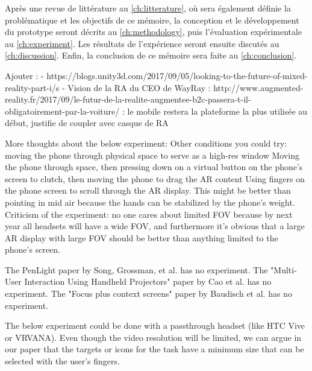 
Après une revue de littérature au \autoref{ch:litterature}, où sera également définie la problématique et les objectifs de ce mémoire, la conception et le développement du prototype seront décrits au \autoref{ch:methodology}, puis l'évaluation expérimentale au \autoref{ch:experiment}. Les résultats de l'expérience seront ensuite discutés au \autoref{ch:discussion}. Enfin, la conclusion de ce mémoire sera faite au \autoref{ch:conclusion}.


Ajouter :
- https://blogs.unity3d.com/2017/09/05/looking-to-the-future-of-mixed-reality-part-i/s
- Vision de la RA du CEO de WayRay : http://www.augmented-reality.fr/2017/09/le-futur-de-la-realite-augmentee-b2c-passera-t-il-obligatoirement-par-la-voiture/ : le mobile restera la plateforme la plus utilisée au début, justifie de coupler avec casque de RA


More thoughts about the below experiment:
Other conditions you could try: moving the phone through physical space to serve as a high-res window
Moving the phone through space, then pressing down on a virtual button on the phone's screen to clutch, then moving the phone to drag the AR content
Using fingers on the phone screen to scroll through the AR display. This might be better than pointing in mid air because the hands can be stabilized by the phone's weight.
Criticism of the experiment: no one cares about limited FOV because by next year all headsets will have a wide FOV, and furthermore it's obvious that a large AR display with large FOV should be better than anything limited to the phone's screen.
 
The PenLight paper by Song, Grossman, et al. has no experiment.
The "Multi-User Interaction Using Handheld Projectors" paper by Cao et al. has no experiment.
The "Focus plus context screens" paper by Baudisch et al. has no experiment.
 
The below experiment could be done with a passthrough headset (like HTC Vive or VRVANA). Even though the video resolution will be limited, we can argue in our paper that the targets or icons for the task have a minimum size that can be selected with the user's fingers.
 
